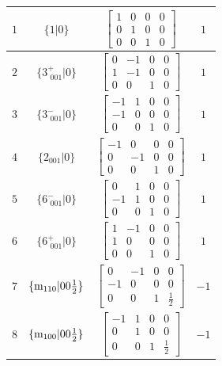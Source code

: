 \documentclass[fleqn,8pt]{jsarticle}
\begin{document}
\begin{longtable}{cccc}
$ 1 $ & $ \{1|0\} $ & $ \begin{bmatrix} 1 & 0 & 0 & 0 \\ 0 & 1 & 0 & 0 \\ 0 & 0 & 1 & 0 \end{bmatrix} $ & $ 1 $ \\ \hline
$ 2 $ & $ \{3^{+}_{\,\,001}|0\} $ & $ \begin{bmatrix} 0 & -1 & 0 & 0 \\ 1 & -1 & 0 & 0 \\ 0 & 0 & 1 & 0 \end{bmatrix} $ & $ 1 $ \\ \hline
$ 3 $ & $ \{3^{-}_{\,\,001}|0\} $ & $ \begin{bmatrix} -1 & 1 & 0 & 0 \\ -1 & 0 & 0 & 0 \\ 0 & 0 & 1 & 0 \end{bmatrix} $ & $ 1 $ \\ \hline
$ 4 $ & $ \{2{}_{001}|0\} $ & $ \begin{bmatrix} -1 & 0 & 0 & 0 \\ 0 & -1 & 0 & 0 \\ 0 & 0 & 1 & 0 \end{bmatrix} $ & $ 1 $ \\ \hline
$ 5 $ & $ \{6^{-}_{\,\,001}|0\} $ & $ \begin{bmatrix} 0 & 1 & 0 & 0 \\ -1 & 1 & 0 & 0 \\ 0 & 0 & 1 & 0 \end{bmatrix} $ & $ 1 $ \\ \hline
$ 6 $ & $ \{6^{+}_{\,\,001}|0\} $ & $ \begin{bmatrix} 1 & -1 & 0 & 0 \\ 1 & 0 & 0 & 0 \\ 0 & 0 & 1 & 0 \end{bmatrix} $ & $ 1 $ \\ \hline
$ 7 $ & $ \{{\rm m}_{110}|0 0 \frac{1}{2}\} $ & $ \begin{bmatrix} 0 & -1 & 0 & 0 \\ -1 & 0 & 0 & 0 \\ 0 & 0 & 1 & \frac{1}{2} \end{bmatrix} $ & $ -1 $ \\ \hline
$ 8 $ & $ \{{\rm m}_{100}|0 0 \frac{1}{2}\} $ & $ \begin{bmatrix} -1 & 1 & 0 & 0 \\ 0 & 1 & 0 & 0 \\ 0 & 0 & 1 & \frac{1}{2} \end{bmatrix} $ & $ -1 $ \\ \hline

\end{longtable}
\end{document}
